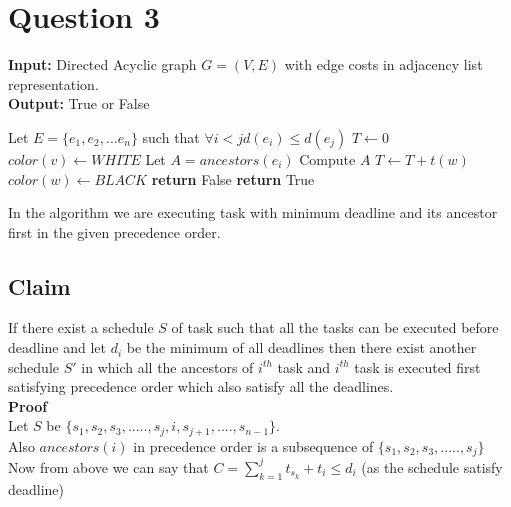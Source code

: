 \documentclass{report}
\begin{document}
 \section*{Question 3}
 
 \textbf{Input:}  Directed Acyclic graph $G = (V,E)$ with edge costs in adjacency list representation.\\
 \textbf{Output:} True or False
 \begin{algorithmic}
 \STATE Let $E = \{e_1, e_2, ...    e_n\}$ such that $\forall i < j d(e_i) \leq d(e_j) $
 \STATE $T\gets 0$ 
    \STATE $color(v) \gets WHITE$
 \ENDFOR
        \STATE Let $A = ancestors(e_i)$ 
        \STATE Compute $A$
                \STATE $T \gets T + t(w)$
                \STATE $color(w) \gets BLACK$
                    \STATE \textbf{return} False
                \ENDIF
            \ENDIF
        \ENDFOR
    \ENDIF
 \ENDFOR
 \STATE \textbf{return} True
 \end{algorithmic}
 
 In the algorithm we are executing task with minimum deadline and its ancestor first in the given precedence order.

 \subsection*{Claim}
 If there exist a schedule $S$ of task such that all the tasks can be executed before deadline and let $d_i$ be the minimum of all deadlines then there exist another schedule $S'$ in which all the ancestors of $i^{th}$ task and $i^{th}$ task is executed first satisfying precedence order which also satisfy all the deadlines.\\
 
 \vspace{1em}
 \textbf{Proof}\\
 Let $S$ be $\{s_1, s_2, s_3,.....,s_j,i,s_{j+1},....,s_{n-1}\}$.\\ 
 Also $ancestors(i)$ in precedence order is a subsequence of $\{s_1, s_2, s_3,.....,s_j\}$\\
 Now from above we can say that $C = \sum^j_{k=1}t_{s_k} + t_i \leq d_i$ (as the schedule satisfy deadline)\\
 
\end{document}
